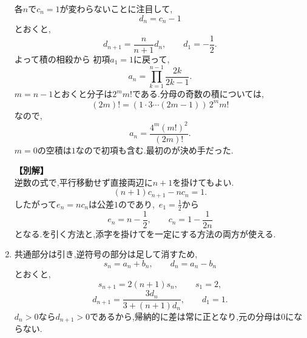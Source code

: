 \begin{enumerate}[label=\textbf{問\arabic*.},leftmargin=3.8em,format=\bookitemlink{practice-advanced}{solution}{problem}]
\[                \]
                各$n$で$c_n=1$が変わらないことに注目して,
                \[
                  d_n=c_n-1
                \]
                とおくと,
                \[
                  d_{n+1}=\frac{n}{n+1}d_n,\qquad d_1=-\frac12.
                \]
                よって積の相殺から
\BookMathLayout{\[
                  d_n=-\frac1{2n},\qquad
                  c_n=\frac{2n-1}{2n},\qquad
                  r_n=\frac{2n}{2n-1}.
                \]}{
\[
\begin{aligned}
d_n&=-\frac1{2n},\\c_n&=\frac{2n-1}{2n},\\r_n&=\frac{2n}{2n-1}.
\end{aligned}
\]
}
                初項$a_1=1$に戻って,
                \[
                  a_n=\prod_{k=1}^{n-1}\frac{2k}{2k-1}.
                \]
                $m=n-1$とおくと分子は$2^m m!$である.分母の奇数の積については,
                \[
                  (2m)!
                   =(1\cdot3\cdots(2m-1))\,2^m m!
                \]
                なので,
                \[
                  a_n=\frac{4^m(m!)^2}{(2m)!}.
                \]
                $m=0$の空積は$1$なので初項も含む.最初のが決め手だった.

                \noindent \textbf{【別解】}\\
                逆数の式で,平行移動せず直接両辺に$n+1$を掛けてもよい.
                \[
                  (n+1)c_{n+1}-nc_n=1.
                \]
                したがって$e_n=nc_n$は公差$1$のであり,\, $\displaystyle e_1=\frac{1}{2}$から
                \[
                  e_n=n-\frac12,\qquad c_n=1-\frac1{2n}
                \]
                となる.を引く方法と,添字を掛けてを一定にする方法の両方が使える.
          \item 共通部分は引き,逆符号の部分は足して消すため,
                \[
                  s_n=a_n+b_n,\qquad d_n=a_n-b_n
                \]
                とおくと,
                \[
                  s_{n+1}=2(n+1)s_n,\qquad s_1=2,
                \]
                \[
                  d_{n+1}
                   =\frac{3d_n}{3+(n+1)d_n},\qquad d_1=1.
                \]
                $d_n>0$なら$d_{n+1}>0$であるから,帰納的に差は常に正となり,元の分母は$0$にならない.


\end{enumerate}
